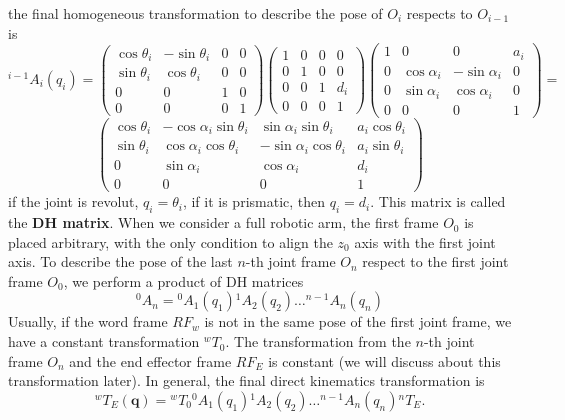 \documentclass[10pt, letterpaper]{report}
\begin{document}
the final homogeneous transformation to describe the pose of $O_{i}$ respects to $O_{i-1}$ is\begin{equation}
    {}^{i-1}A_i(q_i)=\begin{pmatrix}
        \cos\theta_i&-\sin\theta_i&0&0\\ 
        \sin\theta_i&\cos\theta_i&0&0\\ 
        0&0&1&0\\ 
        0&0&0&1
    \end{pmatrix}\begin{pmatrix}
        1&0&0&0\\ 
        0&1&0&0\\ 
        0&0&1&d_i\\ 
        0&0&0&1
    \end{pmatrix} \begin{pmatrix}
       1&0&0&a_i\\ 
       0&\cos\alpha_i&-\sin\alpha_i&0\\ 
        0&\sin\alpha_i&\cos\alpha_i&0\\ 
        0&0&0&1
    \end{pmatrix}=\end{equation}  \begin{equation}
    \begin{pmatrix}
        \cos\theta_i&-\cos\alpha_i\sin\theta_i&\sin\alpha_i\sin\theta_i&a_i\cos\theta_i\\ 
        \sin\theta_i&\cos\alpha_i\cos\theta_i&-\sin\alpha_i\cos\theta_i&a_i\sin\theta_i\\ 
        0&\sin\alpha_i&\cos\alpha_i&d_i\\ 
        0&0&0&1
    \end{pmatrix}
\end{equation} 
if the joint is revolut, $q_i=\theta_i$, if it is prismatic, then $q_i=d_i$. This matrix is called the \textbf{DH matrix}. When we consider a full robotic arm, the first frame $O_0$ is placed arbitrary, with the only condition to align the $z_0$ axis with the first joint axis. To describe the pose of the last $n$-th joint frame $O_n$ respect to the first joint frame $O_0$, we perform a product of DH matrices\begin{equation}
    {}^0A_n={}^0A_1(q_1){}^1A_2(q_2)\dots {}^{n-1}A_n(q_n)
\end{equation}
Usually, if the word frame $RF_w$ is not in the same pose of the first joint frame, we have a constant transformation ${}^wT_0$. The transformation from the $n$-th joint frame $O_n$ and the end effector frame $RF_E$ is constant (we will discuss about this transformation later). In general, the final direct kinematics  transformation   is\begin{equation}
    {}^wT_E(\mathbf q)={}^wT_0{}^0A_1(q_1){}^1A_2(q_2)\dots {}^{n-1}A_n(q_n){}^nT_E.
\end{equation}
\end{document}
